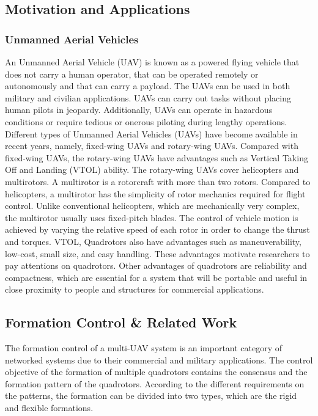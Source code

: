 \documentclass[10pt]{article}
\begin{document}
\subsection{Motivation and Applications}
\subsubsection{Unmanned Aerial Vehicles}
An Unmanned Aerial Vehicle (UAV) is known as a powered flying vehicle that does not carry a human operator, that can be operated remotely or autonomously and that can carry a payload. The UAVs can be used in both military and civilian applications. UAVs can carry out tasks without placing human pilots in jeopardy. Additionally, UAVs can operate in hazardous conditions or require tedious or onerous piloting during lengthy operations. Different types of Unmanned Aerial Vehicles (UAVs) have become available in recent years, namely, fixed-wing UAVs and rotary-wing UAVs. Compared with fixed-wing UAVs, the rotary-wing UAVs have advantages such as Vertical Taking Off and Landing (VTOL) ability. The rotary-wing UAVs cover helicopters and multirotors. A multirotor is a rotorcraft with more than two rotors. Compared to helicopters, a multirotor has the simplicity of rotor mechanics required for flight control. Unlike conventional helicopters, which are mechanically very complex, the multirotor usually uses fixed-pitch blades. The control of vehicle motion is achieved by varying the relative speed of each rotor in order to change the thrust and torques. VTOL, Quadrotors also have advantages such as maneuverability, low-cost, small size, and easy handling. These advantages motivate researchers to pay attentions on quadrotors. Other advantages of quadrotors are reliability and compactness, which are essential for a system that will be portable and useful in close proximity to people and structures for commercial applications.

\subsection{Formation Control \& Related Work}
The formation control of a multi-UAV system is an important category of networked systems due to their commercial and military applications. The control objective of the formation of multiple quadrotors contains the consensus and the formation pattern of the quadrotors. According to the different requirements on the patterns, the formation can be divided into two types, which are the rigid and flexible formations.
\end{document}
